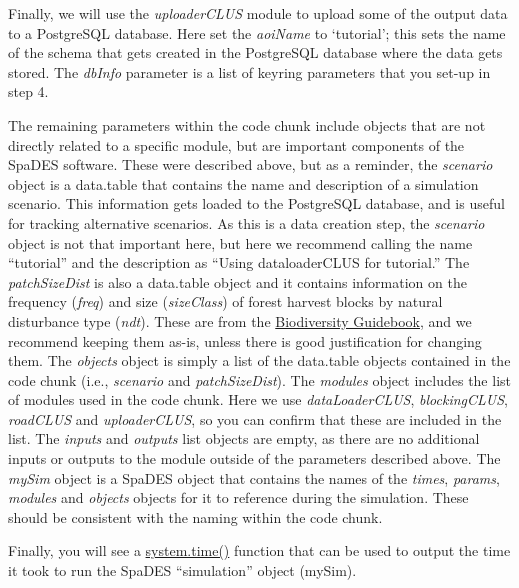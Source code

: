 \documentclass[
]{article}
\begin{document}
Finally, we will use the \emph{uploaderCLUS} module to upload some of
the output data to a PostgreSQL database. Here set the \emph{aoiName} to
`tutorial'; this sets the name of the schema that gets created in the
PostgreSQL database where the data gets stored. The \emph{dbInfo}
parameter is a list of keyring parameters that you set-up in step 4.

The remaining parameters within the code chunk include objects that are
not directly related to a specific module, but are important components
of the SpaDES software. These were described above, but as a reminder,
the \emph{scenario} object is a data.table that contains the name and
description of a simulation scenario. This information gets loaded to
the PostgreSQL database, and is useful for tracking alternative
scenarios. As this is a data creation step, the \emph{scenario} object
is not that important here, but here we recommend calling the name
``tutorial'' and the description as ``Using dataloaderCLUS for
tutorial.'' The \emph{patchSizeDist} is also a data.table object and it
contains information on the frequency (\emph{freq}) and size
(\emph{sizeClass}) of forest harvest blocks by natural disturbance type
(\emph{ndt}). These are from the
\href{https://www.for.gov.bc.ca/ftp/hfp/external/!publish/FPC\%20archive/old\%20web\%20site\%20contents/fpc/fpcguide/BIODIV/chap1.htm\#bid}{Biodiversity
Guidebook}, and we recommend keeping them as-is, unless there is good
justification for changing them. The \emph{objects} object is simply a
list of the data.table objects contained in the code chunk (i.e.,
\emph{scenario} and \emph{patchSizeDist}). The \emph{modules} object
includes the list of modules used in the code chunk. Here we use
\emph{dataLoaderCLUS}, \emph{blockingCLUS}, \emph{roadCLUS} and
\emph{uploaderCLUS}, so you can confirm that these are included in the
list. The \emph{inputs} and \emph{outputs} list objects are empty, as
there are no additional inputs or outputs to the module outside of the
parameters described above. The \emph{mySim} object is a SpaDES object
that contains the names of the \emph{times}, \emph{params},
\emph{modules} and \emph{objects} objects for it to reference during the
simulation. These should be consistent with the naming within the code
chunk.

Finally, you will see a
\href{https://www.rdocumentation.org/packages/base/versions/3.6.2/topics/system.time}{system.time()}
function that can be used to output the time it took to run the SpaDES
``simulation'' object (mySim).
\end{document}
